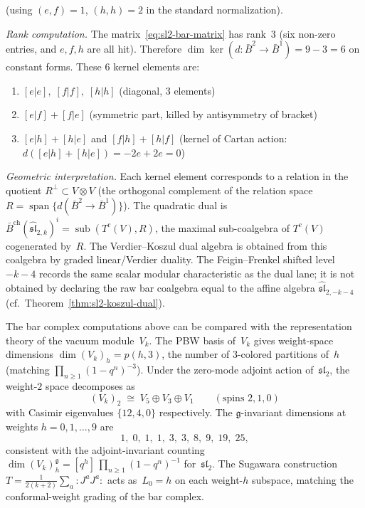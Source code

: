 \begin{computation}
(using $(e,f) = 1$, $(h,h) = 2$ in the standard normalization).

\emph{Rank computation.}
The matrix~\eqref{eq:sl2-bar-matrix} has rank~$3$
(six non-zero entries, and $e, f, h$ are all hit).
Therefore $\dim \ker(d\colon \bar{B}^2 \to \bar{B}^1) = 9 - 3 = 6$
on constant forms. These 6 kernel elements are:
\begin{enumerate}
\item $[e|e],\; [f|f],\; [h|h]$ (diagonal, $3$ elements)
\item $[e|f] + [f|e]$ (symmetric part, killed by antisymmetry of bracket)
\item $[e|h] + [h|e]$ and $[f|h] + [h|f]$
 (kernel of Cartan action: $d([e|h] + [h|e]) = -2e + 2e = 0$)
\end{enumerate}

\emph{Geometric interpretation.}
Each kernel element corresponds to a relation in the quotient
$R^\perp \subset V \otimes V$ (the orthogonal complement of the
relation space $R = \operatorname{span}\{d(\bar{B}^2 \to \bar{B}^1)\}$). The quadratic dual is
$\bar{B}^{\mathrm{ch}}(\widehat{\mathfrak{sl}}_{2,k})^i
= \operatorname{sub}(T^c(V), R)$, the maximal sub-coalgebra of
$T^c(V)$ cogenerated by~$R$. The Verdier--Koszul dual algebra is
obtained from this coalgebra by graded linear/Verdier duality. The
Feigin--Frenkel shifted level
$-k-4$ records the same scalar modular characteristic as the dual
lane; it is not obtained by declaring the raw bar coalgebra equal to
the affine algebra $\widehat{\mathfrak{sl}}_{2,-k-4}$
(cf.\ Theorem~\ref{thm:sl2-koszul-dual}).
\end{computation}

\begin{remark}\label{rem:sl2-vacuum-module-pbw}
The bar complex computations above can be compared with
the representation theory of the vacuum module~$V_k$.
The PBW basis of~$V_k$ gives weight-space dimensions
$\dim(V_k)_h = p(h,3)$, the number of $3$-colored partitions of~$h$
(matching $\prod_{n \ge 1}(1-q^n)^{-3}$).
Under the zero-mode adjoint action of~$\mathfrak{sl}_2$,
the weight-$2$ space decomposes as
\begin{equation}\label{eq:sl2-weight2-decomp}
(V_k)_2 \;\cong\; V_5 \oplus V_3 \oplus V_1
\qquad (\text{spins } 2, 1, 0)
\end{equation}
with Casimir eigenvalues $\{12, 4, 0\}$ respectively.
The $\mathfrak{g}$-invariant dimensions at weights $h = 0, 1,
\ldots, 9$ are
\[
1,\; 0,\; 1,\; 1,\; 3,\; 3,\; 8,\; 9,\; 19,\; 25,
\]
consistent with the adjoint-invariant counting
$\dim (V_k)_h^{\mathfrak{g}} = [q^h]\,\prod_{n \ge 1}
(1-q^n)^{-1}$ for~$\mathfrak{sl}_2$.
The Sugawara construction
$T = \frac{1}{2(k+2)}\sum_a {:}J^a J^a{:}$
acts as~$L_0 = h$ on each weight-$h$ subspace, matching the
conformal-weight grading of the bar complex.
\end{remark}

